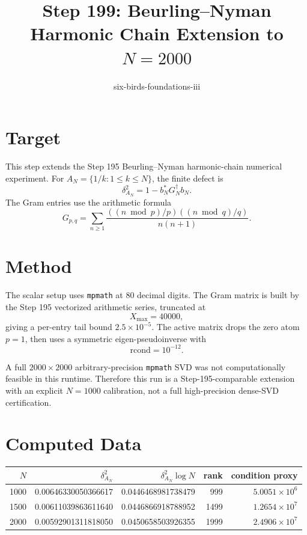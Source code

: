 \documentclass[11pt]{article}
\title{Step 199: Beurling--Nyman Harmonic Chain Extension to \(N=2000\)}
\author{six-birds-foundations-iii}
\date{}
\begin{document}
\maketitle

\section*{Target}

This step extends the Step 195 Beurling--Nyman harmonic-chain numerical
experiment.  For \(A_N=\{1/k:1\le k\le N\}\), the finite defect is
\[
  \delta_{A_N}^2=1-b_N^*G_N^\dagger b_N.
\]
The Gram entries use the arithmetic formula
\[
  G_{p,q}
  =
  \sum_{n\ge1}
  \frac{((n\bmod p)/p)((n\bmod q)/q)}{n(n+1)}.
\]

\section*{Method}

The scalar setup uses \texttt{mpmath} at 80 decimal digits.  The Gram matrix
is built by the Step 195 vectorized arithmetic series, truncated at
\[
  X_{\max}=40000,
\]
giving a per-entry tail bound \(2.5\times10^{-5}\).  The active matrix drops
the zero atom \(p=1\), then uses a symmetric eigen-pseudoinverse with
\[
  \mathrm{rcond}=10^{-12}.
\]

A full \(2000\times2000\) arbitrary-precision \texttt{mpmath} SVD was not
computationally feasible in this runtime.  Therefore this run is a
Step-195-comparable extension with an explicit \(N=1000\) calibration, not a
full high-precision dense-SVD certification.

\section*{Computed Data}

\begin{center}
\begin{tabular}{rrrrr}
\toprule
\(N\) & \(\delta_{A_N}^2\) & \(\delta_{A_N}^2\log N\) & rank & condition proxy\\
\midrule
1000 & 0.00646330050366617 & 0.0446468981738479 & 999 & \(5.0051\times10^6\)\\
1500 & 0.00611039863611640 & 0.0446866918788952 & 1499 & \(1.2654\times10^7\)\\
2000 & 0.00592901311818050 & 0.0450658503926355 & 1999 & \(2.4906\times10^7\)\\
\bottomrule
\end{tabular}
\end{center}
\end{document}
